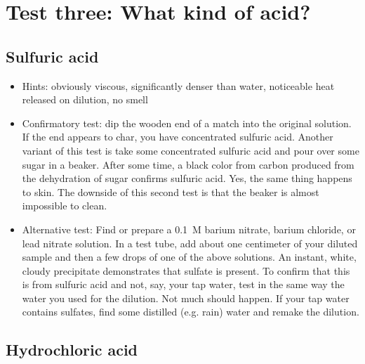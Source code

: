 \section{Test three: What kind of acid?}

\subsection{Sulfuric acid}

\begin{itemize}

\item{Hints: obviously viscous, 
significantly denser than water, 
noticeable heat released on dilution, 
no smell}

\item{Confirmatory test: dip the wooden end of a match into the original solution. 
If the end appears to char, 
you have concentrated sulfuric acid. 
Another variant of this test is take some concentrated sulfuric acid 
and pour over some sugar in a beaker. 
After some time, 
a black color from carbon produced 
from the dehydration of sugar confirms sulfuric acid. 
Yes, 
the same thing happens to skin. 
The downside of this second test is that the beaker 
is almost impossible to clean.}

\item{Alternative test: Find or prepare a 0.1~M barium nitrate, 
barium chloride, 
or lead nitrate solution. 
In a test tube, 
add about one centimeter of your diluted sample 
and then a few drops of one of the above solutions. 
An instant, 
white, 
cloudy precipitate demonstrates that sulfate is present. 
To confirm that this is from sulfuric acid and not, 
say, 
your tap water, 
test in the same way the water you used for the dilution. 
Not much should happen. 
If your tap water contains sulfates, 
find some distilled (e.g. 
rain) water and remake the dilution.}
\end{itemize}

\subsection{Hydrochloric acid}

